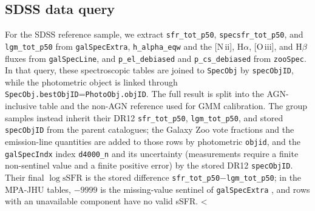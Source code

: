 \documentclass{aa}
\newcommand{\CG}{CG\textsubscript{4}}
\begin{document}
\setlength{\textfloatsep}{12pt plus 2pt minus 3pt}
\setlength{\dbltextfloatsep}{12pt plus 2pt minus 3pt}
\begin{appendix}

\section{SDSS data query}\label{app:sdss_query}

For the SDSS reference sample, we extract \texttt{sfr\_tot\_p50}, \texttt{specsfr\_tot\_p50}, and \texttt{lgm\_tot\_p50} from \texttt{galSpecExtra}, \texttt{h\_alpha\_eqw} and the [N\,{\sc ii}], H\(\alpha\), [O\,{\sc iii}], and H\(\beta\) fluxes from \texttt{galSpecLine}, and \texttt{p\_el\_debiased} and \texttt{p\_cs\_debiased} from \texttt{zooSpec}. In that query, these spectroscopic tables are joined to \texttt{SpecObj} by \texttt{specObjID}, while the photometric object is linked through \texttt{SpecObj.bestObjID}=\texttt{PhotoObj.objID}. The full result is split into the AGN-inclusive table and the non-AGN reference used for GMM calibration. The group samples instead inherit their DR12 \texttt{sfr\_tot\_p50}, \texttt{lgm\_tot\_p50}, and stored \texttt{specObjID} from the parent catalogues; the Galaxy Zoo vote fractions and the emission-line quantities are added to those rows by photometric \texttt{objid}, and the \texttt{galSpecIndx} index \texttt{d4000\_n} and its uncertainty (measurements require a finite non-sentinel value and a finite positive error) by the stored DR12 \texttt{specObjID}. Their final \(\log\mathrm{sSFR}\) is the stored difference \texttt{sfr\_tot\_p50}\(-\)\texttt{lgm\_tot\_p50}; in the MPA-JHU tables, \(-9999\) is the missing-value sentinel of \texttt{galSpecExtra} \citep{Stoughton02}, and rows with an unavailable component have no valid sSFR. <%


\end{appendix}
\end{document}
